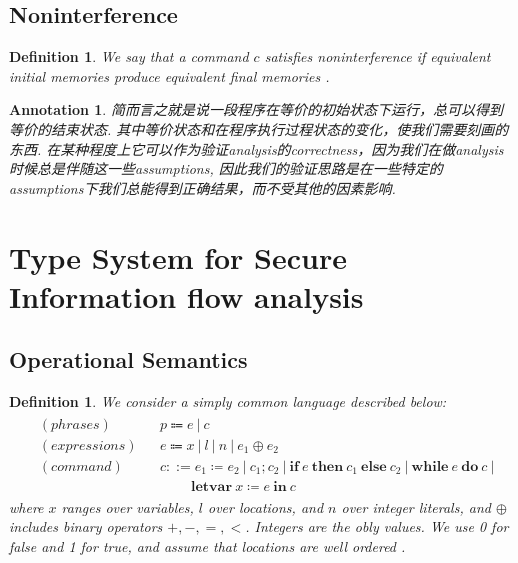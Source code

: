 \documentclass{article}
\newtheorem{definition}[theorem]{Definition}
\newtheorem{annotation}[theorem]{Annotation}
\newcommand{\ifelse}[3]{\ensuremath{\textbf{if}~#1~\textbf{then}~#2~\textbf{else}~#3}}
\newcommand{\newwhiledo}[2]{\ensuremath{\textbf{while}~#1~\textbf{do}~#2}}
\newcommand{\letvar}[2]{\ensuremath{\textbf{letvar}~#1~\textbf{in}~#2}}
\begin{document}
\subsection{Noninterference}

\begin{definition}
\rm We say that a command $c$ satisfies noninterference if equivalent initial memories produce equivalent final memories \cite{noninterference}.
\end{definition}

\begin{annotation}
\rm 简而言之就是说一段程序在等价的初始状态下运行，总可以得到等价的结束状态. 其中等价状态和在程序执行过程状态的变化，使我们需要刻画的东西. 在某种程度上它可以作为验证analysis的correctness，因为我们在做analysis时候总是伴随这一些assumptions, 因此我们的验证思路是在一些特定的assumptions下我们总能得到正确结果，而不受其他的因素影响. 
\end{annotation}

\newpage
\section{Type System for Secure Information flow analysis}

\subsection{Operational Semantics}

\begin{definition}
\rm We consider a simply common language described below:
\[
	\begin{gathered}
	\begin{aligned}
	&(phrases) && p \Coloneqq e~|~c \\
	&(expressions) && e \Coloneqq x ~|~ l ~|~ n ~|~ e_1 \oplus e_2 \\
	&(command) && c ::= e_1 \coloneqq e_2 ~|~ c_1;c_2 ~|~ \ifelse{e}{c_1}{c_2} ~|~ \newwhiledo{e}{c} ~| \\
	&&&\quad\quad~ \letvar{x \coloneqq e}{c}
	\end{aligned}
	\end{gathered}
\]
where $x$ ranges over variables, $l$ over locations, and $n$ over integer literals, and $\oplus$ includes binary operators $+,-,=,<$. Integers are the obly values. We use 0 for false and 1 for true, and assume that locations are well ordered \cite{DGC}.
\end{definition}
\end{document}
